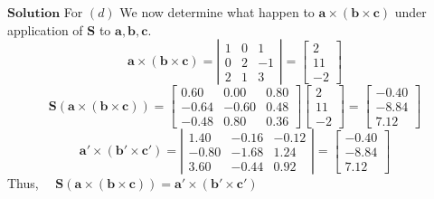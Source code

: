 \documentclass{article}
\begin{document}
\begin{flushleft}
$\boxed{\textbf{Solution}}$ For $(d)$ We now determine what happen to $\mathbf{a}\times(\mathbf{b} \times \mathbf{c})$ under application of $\mathbf{S}$ to $\mathbf{a}, \mathbf{b}, \mathbf{c}$.
$$
\mathbf{a}\times(\mathbf{b} \times \mathbf{c})=\left|\begin{array}{ccc}
1 & 0 & 1 \\
0 & 2 & -1 \\
2 & 1 & 3
\end{array}\right|=\begin{bmatrix}
2 \\
11 \\
-2
\end{bmatrix}
$$
$$
\mathbf{S}(\mathbf{a}\times(\mathbf{b} \times \mathbf{c}))=\begin{bmatrix}
0.60 & 0.00 & 0.80 \\
-0.64 & -0.60 & 0.48 \\
-0.48 & 0.80 & 0.36
\end{bmatrix}\begin{bmatrix}
2 \\
11 \\
-2
\end{bmatrix}=\begin{bmatrix}
-0.40 \\
-8.84 \\
7.12
\end{bmatrix}
$$
$$
\mathbf{a}' \times\left(\mathbf{b}' \times \mathbf{c}'\right)=\left|\begin{array}{ccc}
1.40 & -0.16 & -0.12 \\
-0.80 & -1.68 & 1.24 \\
3.60 & -0.44 & 0.92
\end{array}\right|=\begin{bmatrix}
-0.40 \\
-8.84 \\
7.12
\end{bmatrix}
$$
Thus, $\quad \mathbf{S}(\mathbf{a}\times(\mathbf{b} \times \mathbf{c}))=\mathbf{a}' \times\left(\mathbf{b}' \times \mathbf{c}'\right)$






\end{flushleft}
\end{document}

